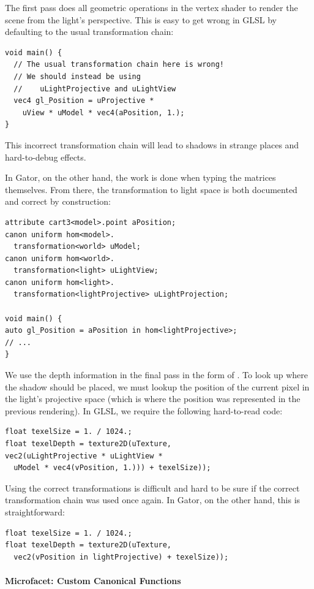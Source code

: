 {The first pass does all geometric operations in the vertex shader to render the scene from the light's perspective.  This is easy to get wrong in GLSL by defaulting to the usual transformation chain:
%
\begin{lstlisting}
void main() {
  // The usual transformation chain here is wrong!
  // We should instead be using 
  //    uLightProjective and uLightView
  vec4 gl_Position = uProjective * 
    uView * uModel * vec4(aPosition, 1.);
}
\end{lstlisting}
%
This incorrect transformation chain will lead to shadows in strange places and hard-to-debug effects.

In Gator, on the other hand, the work is done when typing the matrices themselves.  From there, the transformation to light space is both documented and correct by construction:
%
\begin{lstlisting}
attribute cart3<model>.point aPosition;
canon uniform hom<model>.
  transformation<world> uModel;
canon uniform hom<world>.
  transformation<light> uLightView;
canon uniform hom<light>.
  transformation<lightProjective> uLightProjection;

void main() {
auto gl_Position = aPosition in hom<lightProjective>;
// ...
}
\end{lstlisting}
We use the depth information in the final pass in the form of .  To look up where the shadow should be placed, we must lookup the position of the current pixel in the light's projective space (which is where the position was represented in the previous rendering).
In GLSL, we require the following hard-to-read code:
\begin{lstlisting}
float texelSize = 1. / 1024.;
float texelDepth = texture2D(uTexture, 
vec2(uLightProjective * uLightView * 
  uModel * vec4(vPosition, 1.))) + texelSize));
\end{lstlisting}
Using the correct transformations is difficult and hard to be sure if the correct transformation chain was used once again.  In Gator, on the other hand, this is straightforward:
\begin{lstlisting}
float texelSize = 1. / 1024.;
float texelDepth = texture2D(uTexture, 
  vec2(vPosition in lightProjective) + texelSize));
\end{lstlisting}

\paragraph{Microfacet: Custom Canonical Functions}

}

